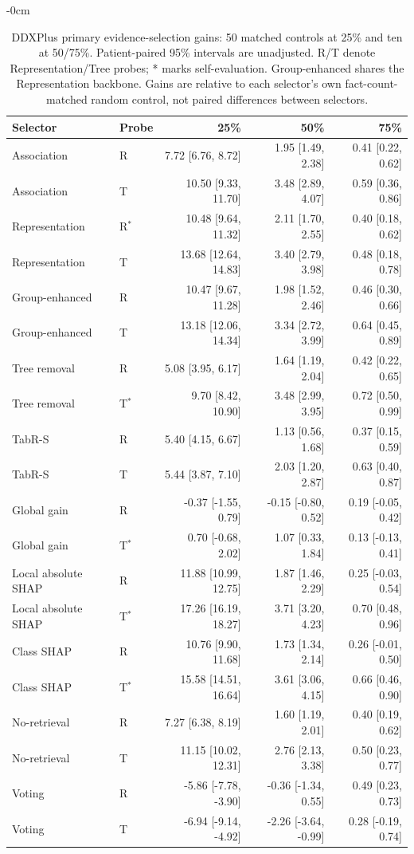 \begin{table}[!tbp]\begin{adjustwidth}{-\extralength}{0cm}\centering\footnotesize
\caption{DDXPlus primary evidence-selection gains: 50 matched controls at 25\% and ten at 50/75\%. Patient-paired 95\% intervals are unadjusted. R/T denote Representation/Tree probes; * marks self-evaluation. Group-enhanced shares the Representation backbone. Gains are relative to each selector's own fact-count-matched random control, not paired differences between selectors.}\label{tab:rq1-both-full-correct}
\begin{tabular}{llrrr}\toprule
Selector & Probe & 25\% & 50\% & 75\% \\ \midrule
Association & R & 7.72 [6.76, 8.72] & 1.95 [1.49, 2.38] & 0.41 [0.22, 0.62] \\
Association & T & 10.50 [9.33, 11.70] & 3.48 [2.89, 4.07] & 0.59 [0.36, 0.86] \\
Representation & R$^{*}$ & 10.48 [9.64, 11.32] & 2.11 [1.70, 2.55] & 0.40 [0.18, 0.62] \\
Representation & T & 13.68 [12.64, 14.83] & 3.40 [2.79, 3.98] & 0.48 [0.18, 0.78] \\
Group-enhanced & R & 10.47 [9.67, 11.28] & 1.98 [1.52, 2.46] & 0.46 [0.30, 0.66] \\
Group-enhanced & T & 13.18 [12.06, 14.34] & 3.34 [2.72, 3.99] & 0.64 [0.45, 0.89] \\
Tree removal & R & 5.08 [3.95, 6.17] & 1.64 [1.19, 2.04] & 0.42 [0.22, 0.65] \\
Tree removal & T$^{*}$ & 9.70 [8.42, 10.90] & 3.48 [2.99, 3.95] & 0.72 [0.50, 0.99] \\
TabR-S & R & 5.40 [4.15, 6.67] & 1.13 [0.56, 1.68] & 0.37 [0.15, 0.59] \\
TabR-S & T & 5.44 [3.87, 7.10] & 2.03 [1.20, 2.87] & 0.63 [0.40, 0.87] \\
Global gain & R & -0.37 [-1.55, 0.79] & -0.15 [-0.80, 0.52] & 0.19 [-0.05, 0.42] \\
Global gain & T$^{*}$ & 0.70 [-0.68, 2.02] & 1.07 [0.33, 1.84] & 0.13 [-0.13, 0.41] \\
Local absolute SHAP & R & 11.88 [10.99, 12.75] & 1.87 [1.46, 2.29] & 0.25 [-0.03, 0.54] \\
Local absolute SHAP & T$^{*}$ & 17.26 [16.19, 18.27] & 3.71 [3.20, 4.23] & 0.70 [0.48, 0.96] \\
Class SHAP & R & 10.76 [9.90, 11.68] & 1.73 [1.34, 2.14] & 0.26 [-0.01, 0.50] \\
Class SHAP & T$^{*}$ & 15.58 [14.51, 16.64] & 3.61 [3.06, 4.15] & 0.66 [0.46, 0.90] \\
No-retrieval & R & 7.27 [6.38, 8.19] & 1.60 [1.19, 2.01] & 0.40 [0.19, 0.62] \\
No-retrieval & T & 11.15 [10.02, 12.31] & 2.76 [2.13, 3.38] & 0.50 [0.23, 0.77] \\
Voting & R & -5.86 [-7.78, -3.90] & -0.36 [-1.34, 0.55] & 0.49 [0.23, 0.73] \\
Voting & T & -6.94 [-9.14, -4.92] & -2.26 [-3.64, -0.99] & 0.28 [-0.19, 0.74] \\
\bottomrule\end{tabular}
\end{adjustwidth}\end{table}
